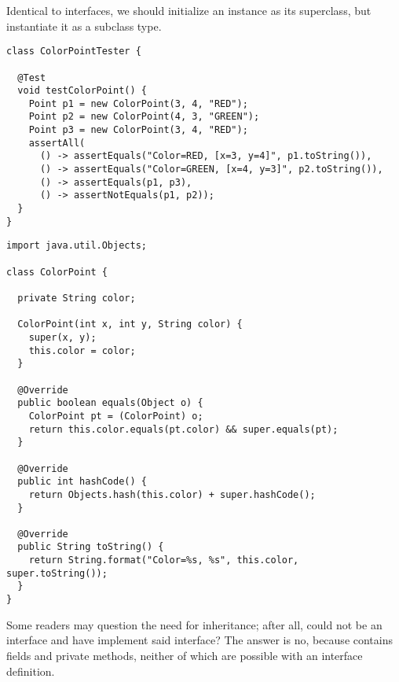 Identical to interfaces, we should initialize an instance as its superclass, but instantiate it as a subclass type.

\begin{lstlisting}[language=MyJava]
class ColorPointTester {

  @Test
  void testColorPoint() {
    Point p1 = new ColorPoint(3, 4, "RED");
    Point p2 = new ColorPoint(4, 3, "GREEN");
    Point p3 = new ColorPoint(3, 4, "RED");
    assertAll(
      () -> assertEquals("Color=RED, [x=3, y=4]", p1.toString()),
      () -> assertEquals("Color=GREEN, [x=4, y=3]", p2.toString()),
      () -> assertEquals(p1, p3),
      () -> assertNotEquals(p1, p2));
  }
}
\end{lstlisting}

\begin{lstlisting}[language=MyJava]
import java.util.Objects;

class ColorPoint {

  private String color;

  ColorPoint(int x, int y, String color) {
    super(x, y);
    this.color = color;
  }

  @Override
  public boolean equals(Object o) {
    ColorPoint pt = (ColorPoint) o;
    return this.color.equals(pt.color) && super.equals(pt);
  }

  @Override
  public int hashCode() {
    return Objects.hash(this.color) + super.hashCode();
  }

  @Override
  public String toString() {
    return String.format("Color=%s, %s", this.color, super.toString());
  }
}
\end{lstlisting}

Some readers may question the need for inheritance; after all, could  not be an interface and have  implement said interface? The answer is no, because  contains fields and private methods, neither of which are possible with an interface definition.


